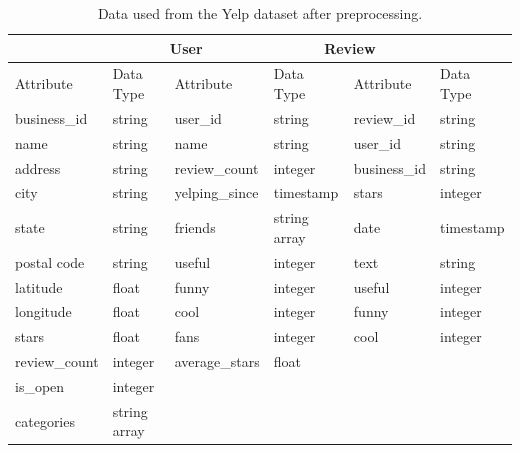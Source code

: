 \begin{table}[h!]
    \centering
    \begin{tabular}{ |p{2cm}|p{2cm}||p{2cm}|p{2cm}||p{2cm}|p{2cm}|}
        \hline
        \rowcolor{Gray}
        \multicolumn{2}{|c||}{Business} & \multicolumn{2}{|c||}{User} & \multicolumn{2}{|c|}{Review}                                           \\
        \hline
        \rowcolor{LightGray}
        Attribute                       & Data Type                   & Attribute                    & Data Type    & Attribute    & Data Type \\
        \hline
        business\_id                    & string                      & user\_id                     & string       & review\_id   & string    \\
        name                            & string                      & name                         & string       & user\_id     & string    \\
        address                         & string                      & review\_count                & integer      & business\_id & string    \\
        city                            & string                      & yelping\_since               & timestamp    & stars        & integer   \\
        state                           & string                      & friends                      & string array & date         & timestamp \\
        postal code                     & string                      & useful                       & integer      & text         & string    \\
        latitude                        & float                       & funny                        & integer      & useful       & integer   \\
        longitude                       & float                       & cool                         & integer      & funny        & integer   \\
        stars                           & float                       & fans                         & integer      & cool         & integer   \\
        review\_count                   & integer                     & average\_stars               & float        &              &           \\
        is\_open                        & integer                     &                              &              &              &           \\
        categories                      & string array                &                              &              &              &           \\
        \hline
    \end{tabular}
    \vspace*{5mm}
    \caption{Data used from the Yelp dataset after preprocessing.}
    \label{tab:yelp-data}
\end{table}

